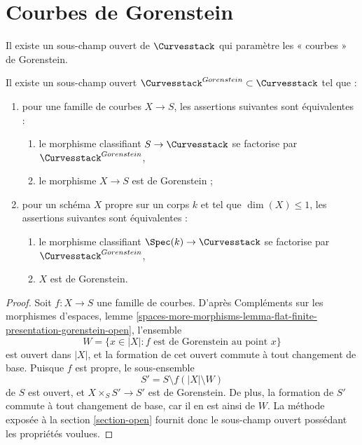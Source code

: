  
 
 
 
 
\section{Courbes de Gorenstein}
\label{section-gorenstein}

\noindent
Il existe un sous-champ ouvert de $\Curvesstack$ qui paramètre
les « courbes » de Gorenstein.

\begin{lemma}
\label{lemma-gorenstein-curves}
Il existe un sous-champ ouvert $\Curvesstack^{Gorenstein} \subset \Curvesstack$
tel que :
\begin{enumerate}
\item pour une famille de courbes $X \to S$, les assertions suivantes sont équivalentes :
\begin{enumerate}
\item le morphisme classifiant $S \to \Curvesstack$ se factorise
par $\Curvesstack^{Gorenstein}$,
\item le morphisme $X \to S$ est de Gorenstein ;
\end{enumerate}
\item pour un schéma $X$ propre sur un corps $k$ et tel que $\dim(X) \leq 1$,
les assertions suivantes sont équivalentes :
\begin{enumerate}
\item le morphisme classifiant $\Spec(k) \to \Curvesstack$ se factorise
par $\Curvesstack^{Gorenstein}$,
\item $X$ est de Gorenstein.
\end{enumerate}
\end{enumerate}
\end{lemma}

\begin{proof}
Soit $f : X \to S$ une famille de courbes. D'après
Compléments sur les morphismes d'espaces, lemme
\ref{spaces-more-morphisms-lemma-flat-finite-presentation-gorenstein-open},
l'ensemble
$$
W = \{x \in |X| : f \text{ est de Gorenstein au point }x\}
$$
est ouvert dans $|X|$, et la formation de cet ouvert commute à tout
changement de base. Puisque $f$ est propre, le sous-ensemble
$$
S' = S \setminus f(|X| \setminus W)
$$
de $S$ est ouvert, et $X \times_S S' \to S'$ est de Gorenstein.
De plus, la formation de $S'$ commute à tout changement de base,
car il en est ainsi de $W$.
La méthode exposée à la section \ref{section-open} fournit donc le
sous-champ ouvert possédant les propriétés voulues.
\end{proof}

